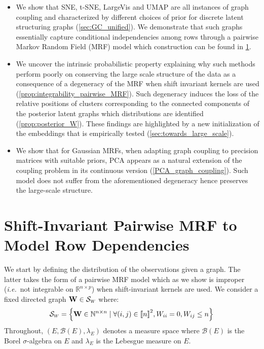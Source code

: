 \begin{itemize}
    \item We show that SNE, t-SNE, LargeVis and UMAP are all instances of graph coupling and characterized by different choices of prior for discrete latent structuring graphs (\cref{sec:GC_unified}). We demonstrate that such graphs essentially capture conditional independencies among rows through a pairwise Markov Random Field (MRF) model which construction can be found in \cref{sec:graph_structure}.
    \item We uncover the intrinsic probabilistic property explaining why such methods perform poorly on conserving the large scale structure of the data as a consequence of a degeneracy of the MRF when shift invariant kernels are used (\cref{prop:integrability_pairwise_MRF}). Such degeneracy induces the loss of the relative positions of clusters corresponding to the connected components of the posterior latent graphs which distributions are identified (\cref{prop:posterior_W}). These findings are highlighted by a new initialization of the embeddings that is empirically tested (\cref{sec:towards_large_scale}).
    \item We show that for Gaussian MRFs, when adapting graph coupling to precision matrices with suitable priors, PCA appears as a natural extension of the coupling problem in its continuous version (\cref{PCA_graph_coupling}). Such model does not suffer from the aforementioned degeneracy hence preserves the large-scale structure.
\end{itemize}

\section {Shift-Invariant Pairwise MRF to Model Row Dependencies} \label{sec:graph_structure}

We start by defining the distribution of the observations given a graph. The latter takes the form of a pairwise MRF model which as we show is improper (\textit{i.e.}\ not integrable on $\mathbb{R}^{n \times p}$) when shift-invariant kernels are used. We consider a fixed directed graph $\Wb \in \mathcal{S}_{\scaleto{W}{4pt}}$ where:
$$\mathcal{S}_{\scaleto{W}{4pt}} = \left\{\Wb \in \mathbb{N}^{n \times n} \mid \forall (i,j) \in \integ{n}^2, W_{ii}=0, W_{ij} \leq n \right\}$$
Throughout, $(E, \mathcal{B}(E), \lambda_E)$ denotes a measure space where $\mathcal{B}(E)$ is the Borel $\sigma$-algebra on $E$ and $\lambda_E$ is the Lebesgue measure on $E$.


